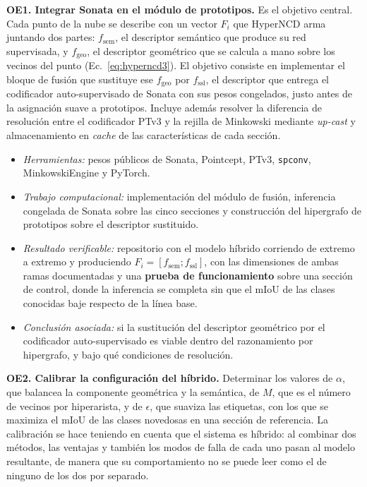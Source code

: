 \medskip
\noindent\textbf{OE1. Integrar Sonata en el módulo de prototipos.} Es el objetivo
central. Cada punto de la nube se describe con un vector $F_i$ que HyperNCD arma
juntando dos partes: $f_{\mathrm{sem}}$, el descriptor semántico que produce su
red supervisada, y $f_{\mathrm{geo}}$, el descriptor geométrico que se calcula a
mano sobre los vecinos del punto (Ec.~\eqref{eq:hyperncd3}). El objetivo consiste
en implementar el bloque de fusión que sustituye ese $f_{\mathrm{geo}}$ por
$f_{\mathrm{ssl}}$, el descriptor que entrega el codificador auto-supervisado de
Sonata con sus pesos congelados, justo antes de la asignación suave a prototipos.
Incluye además resolver la diferencia de resolución entre el codificador PTv3 y
la rejilla de Minkowski mediante \emph{up-cast} y almacenamiento en \emph{cache}
de las características de cada sección.

\begin{itemize}
\item \textit{Herramientas:} pesos públicos de Sonata, Pointcept, PTv3,
\texttt{spconv}, MinkowskiEngine y PyTorch.
\item \textit{Trabajo computacional:} implementación del módulo de fusión,
inferencia congelada de Sonata sobre las cinco secciones y construcción del
hipergrafo de prototipos sobre el descriptor sustituido.
\item \textit{Resultado verificable:} repositorio con el modelo híbrido corriendo
de extremo a extremo y produciendo $F_i=[f_{\mathrm{sem}};f_{\mathrm{ssl}}]$, con
las dimensiones de ambas ramas documentadas y una \textbf{prueba de
funcionamiento} sobre una sección de control, donde la inferencia se completa sin
que el mIoU de las clases conocidas baje respecto de la línea base.
\item \textit{Conclusión asociada:} si la sustitución del descriptor geométrico
por el codificador auto-supervisado es viable dentro del razonamiento por
hipergrafo, y bajo qué condiciones de resolución.
\end{itemize}

\medskip
\noindent\textbf{OE2. Calibrar la configuración del híbrido.} Determinar los
valores de $\alpha$, que balancea la componente geométrica y la semántica, de $M$,
que es el número de vecinos por hiperarista, y de $\epsilon$, que suaviza las
etiquetas, con los que se maximiza el mIoU de las clases novedosas en una sección
de referencia. La calibración se hace teniendo en cuenta que el sistema es
híbrido: al combinar dos métodos, las ventajas y también los modos de falla de
cada uno pasan al modelo resultante, de manera que su comportamiento no se puede
leer como el de ninguno de los dos por separado.

